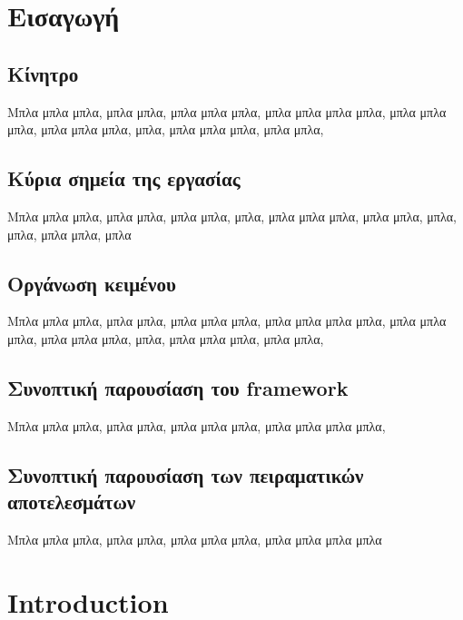 
\chapter{Εισαγωγή}

\section{Κίνητρο}
  Μπλα μπλα μπλα, μπλα μπλα, μπλα μπλα μπλα, μπλα μπλα μπλα μπλα,
  μπλα μπλα μπλα, μπλα μπλα μπλα, μπλα, μπλα μπλα μπλα, μπλα μπλα,

\section{Κύρια σημεία της εργασίας}
  Μπλα μπλα μπλα, μπλα μπλα, μπλα μπλα, μπλα, μπλα μπλα
  μπλα, μπλα μπλα, μπλα, μπλα, μπλα μπλα, μπλα

\section{Οργάνωση κειμένου}
  Μπλα μπλα μπλα, μπλα μπλα, μπλα μπλα μπλα, μπλα μπλα μπλα μπλα,
  μπλα μπλα μπλα, μπλα μπλα μπλα, μπλα, μπλα μπλα μπλα, μπλα μπλα,

\section{Συνοπτική παρουσίαση του framework}
  Μπλα μπλα μπλα, μπλα μπλα, μπλα μπλα μπλα, μπλα μπλα μπλα μπλα,

\section{Συνοπτική παρουσίαση των πειραματικών αποτελεσμάτων}
  Μπλα μπλα μπλα, μπλα μπλα, μπλα μπλα μπλα, μπλα μπλα μπλα μπλα

\setcounter{chapter}{0}

\chapter{Introduction}


